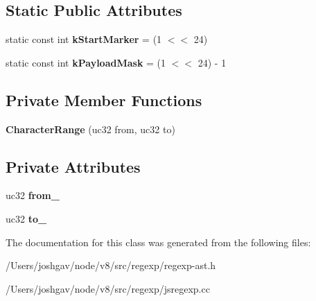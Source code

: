 \subsection*{Static Public Attributes}
\begin{DoxyCompactItemize}
\item 
static const int {\bfseries k\+Start\+Marker} = (1 $<$$<$ 24)\hypertarget{classv8_1_1internal_1_1_character_range_af71c0127ae30da61d62047b96dfa1804}{}\label{classv8_1_1internal_1_1_character_range_af71c0127ae30da61d62047b96dfa1804}

\item 
static const int {\bfseries k\+Payload\+Mask} = (1 $<$$<$ 24) -\/ 1\hypertarget{classv8_1_1internal_1_1_character_range_a9bd1ec7131c945c2d221c4d43dec04fb}{}\label{classv8_1_1internal_1_1_character_range_a9bd1ec7131c945c2d221c4d43dec04fb}

\end{DoxyCompactItemize}
\subsection*{Private Member Functions}
\begin{DoxyCompactItemize}
\item 
{\bfseries Character\+Range} (uc32 from, uc32 to)\hypertarget{classv8_1_1internal_1_1_character_range_a41cd8bd8415b2420c179d2635ca17cc1}{}\label{classv8_1_1internal_1_1_character_range_a41cd8bd8415b2420c179d2635ca17cc1}

\end{DoxyCompactItemize}
\subsection*{Private Attributes}
\begin{DoxyCompactItemize}
\item 
uc32 {\bfseries from\+\_\+}\hypertarget{classv8_1_1internal_1_1_character_range_ae0857b275815061e2525b5c280096ecd}{}\label{classv8_1_1internal_1_1_character_range_ae0857b275815061e2525b5c280096ecd}

\item 
uc32 {\bfseries to\+\_\+}\hypertarget{classv8_1_1internal_1_1_character_range_a6470cdc1e591852669223cdb9bb79a42}{}\label{classv8_1_1internal_1_1_character_range_a6470cdc1e591852669223cdb9bb79a42}

\end{DoxyCompactItemize}


The documentation for this class was generated from the following files\+:\begin{DoxyCompactItemize}
\item 
/\+Users/joshgav/node/v8/src/regexp/regexp-\/ast.\+h\item 
/\+Users/joshgav/node/v8/src/regexp/jsregexp.\+cc\end{DoxyCompactItemize}
